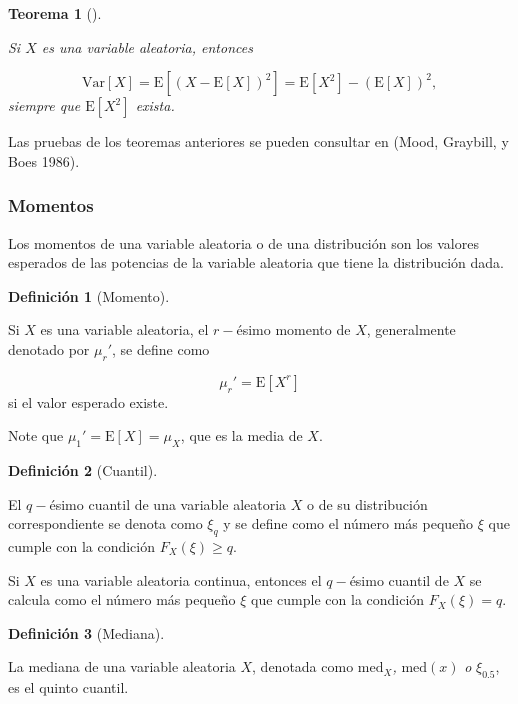 \documentclass[
  letterpaper,
  DIV=11,
  numbers=noendperiod]{scrreport}
\theoremstyle{plain}
\newtheorem{theorem}{Teorema}[chapter]
\theoremstyle{definition}
\newtheorem{definition}{Definición}[chapter]
\theoremstyle{definition}
\theoremstyle{plain}
\theoremstyle{remark}
\begin{document}
\begin{theorem}[]\protect\hypertarget{thm-var}{}\label{thm-var}

Si \(X\) es una variable aleatoria, entonces

\[\mathrm{Var}[X] = \mathrm E[(X-\mathrm E[X])^2] = \mathrm E[X^2] - (\mathrm E[X])^2,\]
siempre que \(\mathrm E[X^2]\) exista.

\end{theorem}

Las pruebas de los teoremas anteriores se pueden consultar en (Mood,
Graybill, y Boes 1986).

\subsubsection{Momentos}\label{momentos}

Los momentos de una variable aleatoria o de una distribución son los
valores esperados de las potencias de la variable aleatoria que tiene la
distribución dada.

\begin{definition}[Momento]\protect\hypertarget{def-moment}{}\label{def-moment}

Si \(X\) es una variable aleatoria, el \(r-\)ésimo momento de \(X\),
generalmente denotado por \(\mu_r'\), se define como

\[ \mu_r'=\mathrm E[X^r] \] si el valor esperado existe.

\end{definition}

Note que \(\mu_1' = \mathrm E[X] = \mu_X\), que es la media de \(X\).

\begin{definition}[Cuantil]\protect\hypertarget{def-quant}{}\label{def-quant}

El \(q-\)ésimo cuantil de una variable aleatoria \(X\) o de su
distribución correspondiente se denota como \(\xi_q\) y se define como
el número más pequeño \(\xi\) que cumple con la condición
\(F_X(\xi) \geq q\).

\end{definition}

Si \(X\) es una variable aleatoria continua, entonces el \(q-\)ésimo
cuantil de \(X\) se calcula como el número más pequeño \(\xi\) que
cumple con la condición \(F_X(\xi) = q\).

\begin{definition}[Mediana]\protect\hypertarget{def-median}{}\label{def-median}

La mediana de una variable aleatoria \(X\), denotada como
\(\mathrm{med}_X\)\emph{,} \(\mathrm{med}(x)\) \emph{o} \(\xi_{0.5}\),
es el quinto cuantil.

\end{definition}
\end{document}
